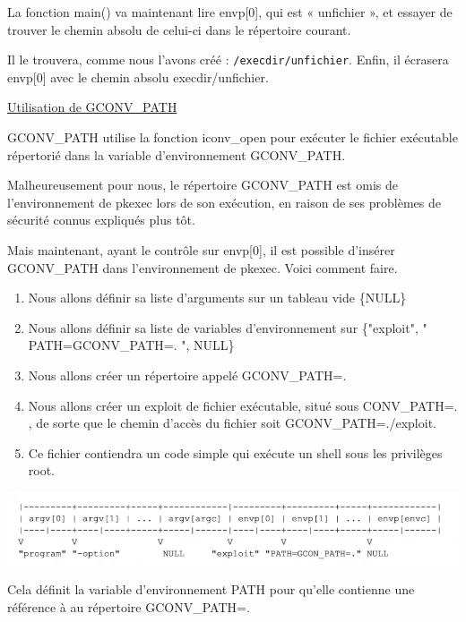 \documentclass[12pt,a4paper]{article}
\newcommand{\code}[1]{\colorbox{light-gray}{\texttt{#1}}}
\begin{document}
\begin{flushleft}
                \item La fonction main() va maintenant lire envp[0], qui est « unfichier », et essayer de trouver le chemin absolu de celui-ci dans le répertoire courant. 
                \item Il le trouvera, comme nous l’avons créé :  \code{/execdir/unfichier}. Enfin, il écrasera envp[0] avec le chemin absolu execdir/unfichier.
            \item \underline{Utilisation de GCONV\_PATH}
            \item GCONV\_PATH utilise la fonction iconv\_open pour exécuter le fichier exécutable répertorié dans la variable d’environnement GCONV\_PATH.
            \item Malheureusement pour nous, le répertoire GCONV\_PATH est omis de l’environnement de pkexec lors de son exécution, en raison de ses problèmes de sécurité connus expliqués plus tôt.
            \item Mais maintenant, ayant le contrôle sur envp[0], il est possible d'insérer GCONV\_PATH dans l'environnement de pkexec. Voici comment faire.
            \begin{enumerate}
                \item Nous allons définir sa liste d’arguments sur un tableau vide \{NULL\}
                \item Nous allons définir sa liste de variables d’environnement sur \{"exploit", " PATH=GCONV\_PATH=. ", NULL\}
                \item Nous allons créer un répertoire appelé GCONV\_PATH=.
                \item Nous allons créer un exploit de fichier exécutable, situé sous CONV\_PATH=. , de sorte que le chemin d’accès du fichier soit GCONV\_PATH=./exploit.
                \item Ce fichier contiendra un code simple qui exécute un shell sous les privilèges root.
            \end{enumerate}
            \begin{center}
                \includegraphics[scale=0.4]{exec} \cite{CVE2021425:online}
            \end{center}
            \item Cela définit la variable d’environnement PATH pour qu’elle contienne une référence à au répertoire GCONV\_PATH=. 

\end{flushleft}
\end{document}
